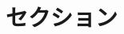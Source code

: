 \documentclass[article]{jlreq}
\begin{document}
\maketitle

\section{セクション}



\printbibliography
\end{document}
